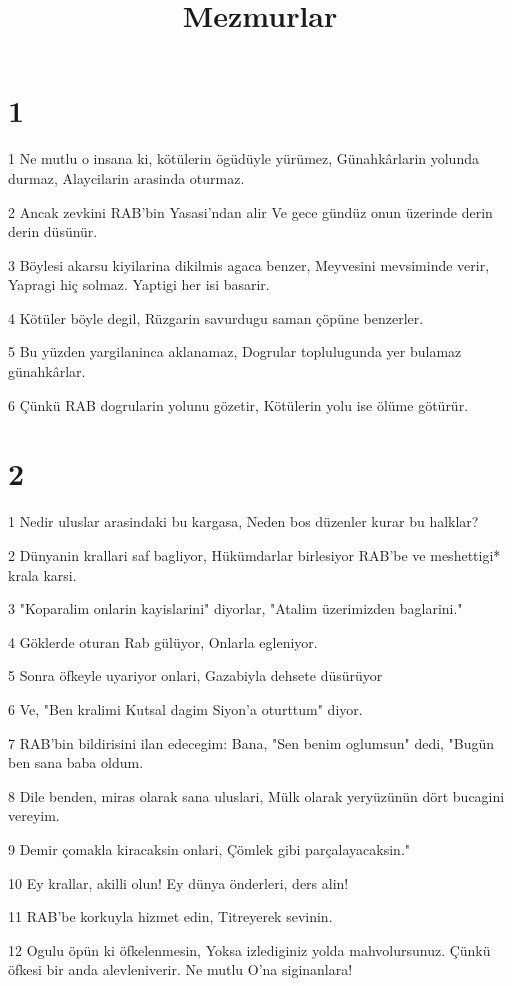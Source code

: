 

\title{Mezmurlar}


\chapter{1}

\par 1 Ne mutlu o insana ki, kötülerin ögüdüyle yürümez, Günahkârlarin yolunda durmaz, Alaycilarin arasinda oturmaz.
\par 2 Ancak zevkini RAB'bin Yasasi'ndan alir Ve gece gündüz onun üzerinde derin derin düsünür.
\par 3 Böylesi akarsu kiyilarina dikilmis agaca benzer, Meyvesini mevsiminde verir, Yapragi hiç solmaz. Yaptigi her isi basarir.
\par 4 Kötüler böyle degil, Rüzgarin savurdugu saman çöpüne benzerler.
\par 5 Bu yüzden yargilaninca aklanamaz, Dogrular toplulugunda yer bulamaz günahkârlar.
\par 6 Çünkü RAB dogrularin yolunu gözetir, Kötülerin yolu ise ölüme götürür.

\chapter{2}

\par 1 Nedir uluslar arasindaki bu kargasa, Neden bos düzenler kurar bu halklar?
\par 2 Dünyanin krallari saf bagliyor, Hükümdarlar birlesiyor RAB'be ve meshettigi* krala karsi.
\par 3 "Koparalim onlarin kayislarini" diyorlar, "Atalim üzerimizden baglarini."
\par 4 Göklerde oturan Rab gülüyor, Onlarla egleniyor.
\par 5 Sonra öfkeyle uyariyor onlari, Gazabiyla dehsete düsürüyor
\par 6 Ve, "Ben kralimi Kutsal dagim Siyon'a oturttum" diyor.
\par 7 RAB'bin bildirisini ilan edecegim: Bana, "Sen benim oglumsun" dedi, "Bugün ben sana baba oldum.
\par 8 Dile benden, miras olarak sana uluslari, Mülk olarak yeryüzünün dört bucagini vereyim.
\par 9 Demir çomakla kiracaksin onlari, Çömlek gibi parçalayacaksin."
\par 10 Ey krallar, akilli olun! Ey dünya önderleri, ders alin!
\par 11 RAB'be korkuyla hizmet edin, Titreyerek sevinin.
\par 12 Ogulu öpün ki öfkelenmesin, Yoksa izlediginiz yolda mahvolursunuz. Çünkü öfkesi bir anda alevleniverir. Ne mutlu O'na siginanlara!

